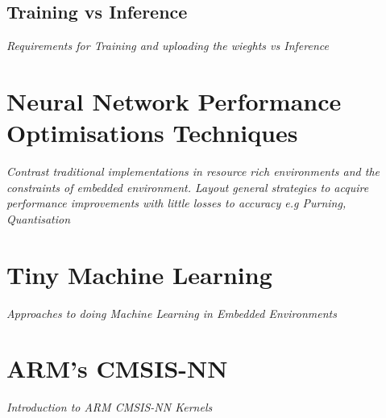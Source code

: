 \subsection{Training vs Inference}
\textit{Requirements for Training and uploading the wieghts vs Inference}

\section{Neural Network Performance Optimisations Techniques}
\textit{Contrast traditional implementations in resource rich environments and the constraints of embedded environment. Layout general strategies to acquire performance improvements with little losses to accuracy e.g Purning, Quantisation}

\section{Tiny Machine Learning}
\textit{Approaches to doing Machine Learning in Embedded Environments}

\section{ARM's CMSIS-NN}
\textit{Introduction to ARM CMSIS-NN Kernels}
